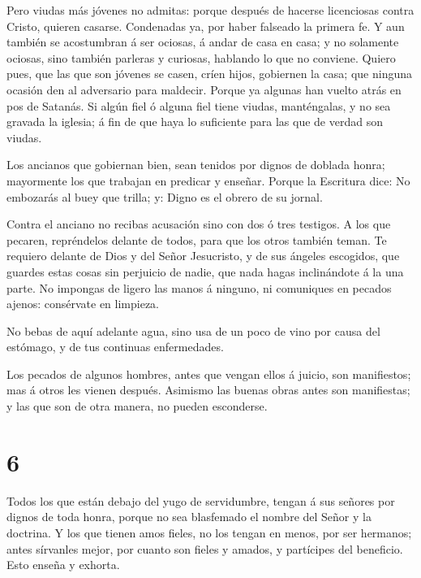  Pero viudas más jóvenes no admitas: porque después de
hacerse licenciosas contra Cristo, quieren casarse. 
Condenadas ya, por haber falseado la primera fe.  Y aun
también se acostumbran á ser ociosas, á andar de casa en casa; y no
solamente ociosas, sino también parleras y curiosas, hablando lo que no
conviene.  Quiero pues, que las que son jóvenes se casen,
críen hijos, gobiernen la casa; que ninguna ocasión den al adversario
para maldecir.  Porque ya algunas han vuelto atrás en pos
de Satanás.  Si algún fiel ó alguna fiel tiene viudas,
manténgalas, y no sea gravada la iglesia; á fin de que haya lo
suficiente para las que de verdad son viudas.

 Los ancianos que gobiernan bien, sean tenidos por dignos
de doblada honra; mayormente los que trabajan en predicar y enseñar.
 Porque la Escritura dice: No embozarás al buey que trilla;
y: Digno es el obrero de su jornal.

 Contra el anciano no recibas acusación sino con dos ó tres
testigos.  A los que pecaren, repréndelos delante de todos,
para que los otros también teman.  Te requiero delante de
Dios y del Señor Jesucristo, y de sus ángeles escogidos, que guardes
estas cosas sin perjuicio de nadie, que nada hagas inclinándote á la una
parte.  No impongas de ligero las manos á ninguno, ni
comuniques en pecados ajenos: consérvate en limpieza.

 No bebas de aquí adelante agua, sino usa de un poco de
vino por causa del estómago, y de tus continuas enfermedades.

 Los pecados de algunos hombres, antes que vengan ellos á
juicio, son manifiestos; mas á otros les vienen después. 
Asimismo las buenas obras antes son manifiestas; y las que son de otra
manera, no pueden esconderse.

\hypertarget{section-5}{%
\section{6}\label{section-5}}

 Todos los que están debajo del yugo de servidumbre, tengan
á sus señores por dignos de toda honra, porque no sea blasfemado el
nombre del Señor y la doctrina.  Y los que tienen amos
fieles, no los tengan en menos, por ser hermanos; antes sírvanles mejor,
por cuanto son fieles y amados, y partícipes del beneficio. Esto enseña
y exhorta.

